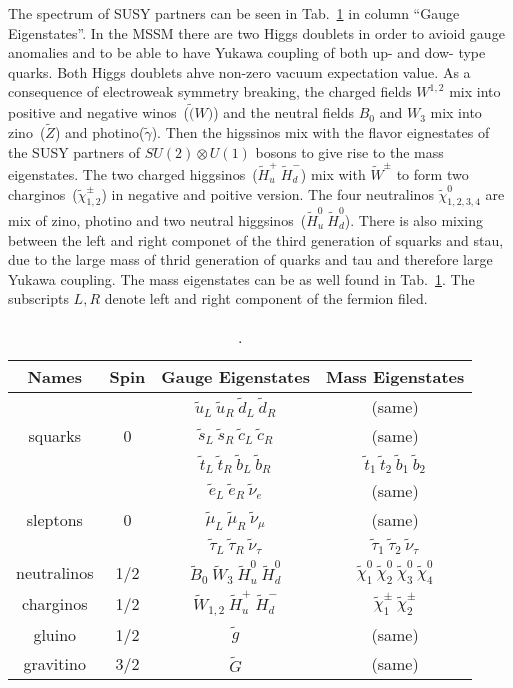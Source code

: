 The spectrum of SUSY partners can be seen in Tab.~\ref{tab:SUSYspectrum} in column ``Gauge Eigenstates''. In the MSSM there are two Higgs doublets in order  to avioid gauge anomalies and to be able to have Yukawa coupling of both up- and dow- type quarks. Both Higgs doublets ahve non-zero vacuum expectation value. As a consequence of electroweak symmetry breaking, the charged fields $W^{1,2}$ mix into positive and negative winos~($\tilde(W)$) and the neutral fields $B_{0}$ and $W_{3}$ mix into zino~($\tilde{Z}$) and photino($\tilde{\gamma}$). Then the higssinos mix with the flavor eignestates of the SUSY partners of $SU(2) \otimes U(1)$ bosons to give rise to the mass eigenstates. The two charged higgsinos~($\tilde{H}_{u}^{+}~\tilde{H}_{d}^{-}$) mix with $\tilde{W}^{\pm}$ to form two charginos~($\tilde{\chi}_{1,2}^{\pm}$) in negative and poitive version. The four neutralinos $\tilde{\chi}_{1,2,3,4}^{0}$ are mix of zino, photino and two neutral higgsinos~($\tilde{H}_{u}^{0}~\tilde{H}_{d}^{0}$). There is also mixing between the left and right componet of the third generation of squarks and stau, due to the large mass of thrid generation of quarks and tau and therefore large Yukawa coupling. The mass eigenstates can be as well found in Tab.~\ref{tab:SUSYspectrum}. The subscripts $L,R$ denote left and right component of the  fermion filed.

\begin{table}[h]
\begin{center}
\begin{tabular}{|c|c|c|c|}
\hline
Names & Spin  & Gauge Eigenstates & Mass Eigenstates  \\
\hline
        &   & $\tilde{u}_{L}~\tilde{u}_{R}~\tilde{d}_{L}~\tilde{d}_{R}$  & (same) \\
squarks & 0 & $\tilde{s}_{L}~\tilde{s}_{R}~\tilde{c}_{L}~\tilde{c}_{R}$  & (same) \\
        &   & $\tilde{t}_{L}~\tilde{t}_{R}~\tilde{b}_{L}~\tilde{b}_{R}$  & $\tilde{t}_{1}~\tilde{t}_{2}~\tilde{b}_{1}~\tilde{b}_{2}$ \\
\hline
         &   & $\tilde{e}_{L}~\tilde{e}_{R}~\tilde{\nu}_{e}$  & (same) \\
sleptons & 0 & $\tilde{\mu}_{L}~\tilde{\mu}_{R}~\tilde{\nu}_{\mu}$  & (same) \\
         &   & $\tilde{\tau}_{L}~\tilde{\tau}_{R}~\tilde{\nu}_{\tau}$  & $\tilde{\tau}_{1}~\tilde{\tau}_{2}~\tilde{\nu}_{\tau}$ \\
\hline
neutralinos & 1/2 & $\tilde{B}_{0}~\tilde{W}_{3}~\tilde{H}_{u}^{0}~\tilde{H}_{d}^{0}$  & $\tilde{\chi}_{1}^{0}~\tilde{\chi}_{2}^{0}~\tilde{\chi}_{3}^{0}~\tilde{\chi}_{4}^{0} $ \\
\hline
charginos & 1/2 & $\tilde{W}_{1,2}~\tilde{H}_{u}^{+}~\tilde{H}_{d}^{-}$  & $\tilde{\chi}_{1}^{\pm}~\tilde{\chi}_{2}^{\pm} $ \\
\hline
gluino & 1/2 & $\tilde{g}$  & (same) \\
\hline
gravitino & 3/2 & $\tilde{G}$  & (same) \\
\hline
\end{tabular}
\caption[Table caption text]{\cite{Martin:1997ns}. }
\label{tab:SUSYspectrum}
\end{center}
\end{table}

